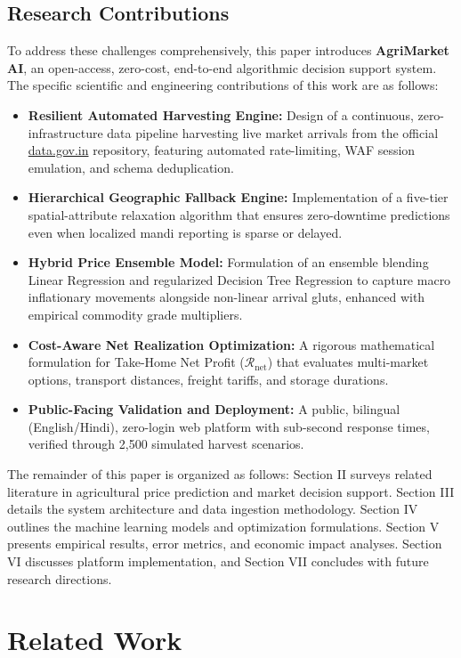 \documentclass[conference]{IEEEtran}
\begin{document}
\subsection{Research Contributions}
To address these challenges comprehensively, this paper introduces \textbf{AgriMarket AI}, an open-access, zero-cost, end-to-end algorithmic decision support system. The specific scientific and engineering contributions of this work are as follows:
\begin{itemize}
    \item \textbf{Resilient Automated Harvesting Engine:} Design of a continuous, zero-infrastructure data pipeline harvesting live market arrivals from the official \url{data.gov.in} repository, featuring automated rate-limiting, WAF session emulation, and schema deduplication.
    \item \textbf{Hierarchical Geographic Fallback Engine:} Implementation of a five-tier spatial-attribute relaxation algorithm that ensures zero-downtime predictions even when localized mandi reporting is sparse or delayed.
    \item \textbf{Hybrid Price Ensemble Model:} Formulation of an ensemble blending Linear Regression and regularized Decision Tree Regression to capture macro inflationary movements alongside non-linear arrival gluts, enhanced with empirical commodity grade multipliers.
    \item \textbf{Cost-Aware Net Realization Optimization:} A rigorous mathematical formulation for Take-Home Net Profit ($\mathcal{R}_{\text{net}}$) that evaluates multi-market options, transport distances, freight tariffs, and storage durations.
    \item \textbf{Public-Facing Validation and Deployment:} A public, bilingual (English/Hindi), zero-login web platform with sub-second response times, verified through 2,500 simulated harvest scenarios.
\end{itemize}

The remainder of this paper is organized as follows: Section II surveys related literature in agricultural price prediction and market decision support. Section III details the system architecture and data ingestion methodology. Section IV outlines the machine learning models and optimization formulations. Section V presents empirical results, error metrics, and economic impact analyses. Section VI discusses platform implementation, and Section VII concludes with future research directions.

\section{Related Work}
\end{document}

